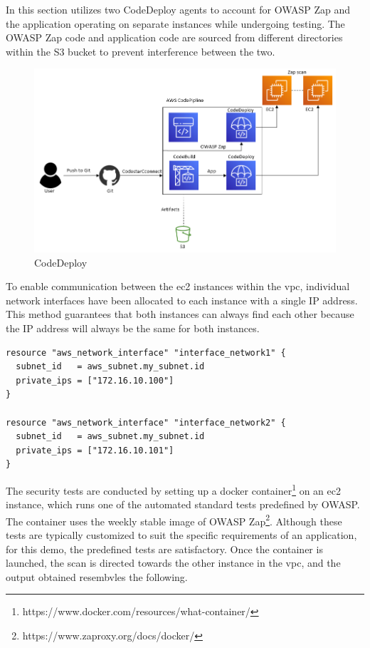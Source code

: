 In this section utilizes two CodeDeploy agents to account for OWASP Zap and the application operating on separate instances while undergoing testing. The OWASP Zap code and application code are sourced from different directories within the S3 bucket to prevent interference between the two.

\vspace{2mm}
\begin{figure}[H]
    \centering
    \includegraphics[width=0.6\columnwidth]{Images/aws-piplin-5.png}
    \caption{CodeDeploy}
    \label{fig: CodeDeploy}
\end{figure}


To enable communication between the \acrshort{ec2} instances within the \acrshort{vpc}, individual network interfaces have been allocated to each instance with a single IP address. This method guarantees that both instances can always find each other because the IP address will always be the same for both instances.

\begin{tcolorbox}
\begin{verbatim}
resource "aws_network_interface" "interface_network1" {
  subnet_id   = aws_subnet.my_subnet.id
  private_ips = ["172.16.10.100"]
}

resource "aws_network_interface" "interface_network2" {
  subnet_id   = aws_subnet.my_subnet.id
  private_ips = ["172.16.10.101"]
}
\end{verbatim}
\end{tcolorbox}

The security tests are conducted by setting up a docker container\footnote{https://www.docker.com/resources/what-container/} on an \acrshort{ec2} instance, which runs one of the automated standard tests predefined by OWASP. The container uses the weekly stable image of OWASP Zap\footnote{https://www.zaproxy.org/docs/docker/}. Although these tests are typically customized to suit the specific requirements of an application, for this demo, the predefined tests are satisfactory. Once the container is launched, the scan is directed towards the other instance in the \acrshort{vpc}, and the output obtained resembvles the following.

